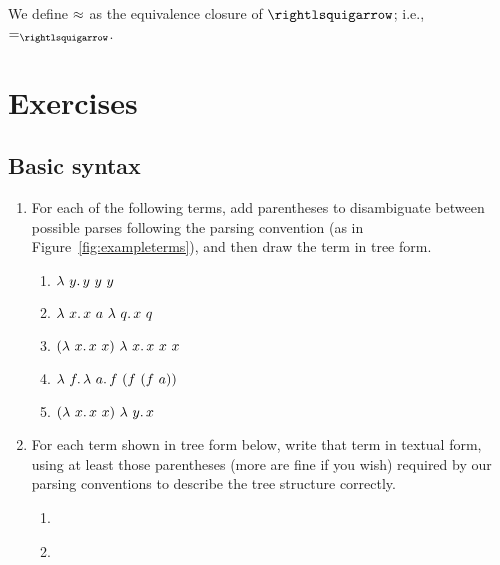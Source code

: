 \begin{definition}
\label{def:betaeq}
  We define $\approx$ as the equivalence closure of $\betaa$; i.e., $=_{\betaa}$.
  \end{definition}

\section{Exercises}

\subsection{Basic syntax}

\begin{enumerate}

  \item For each of the following terms, add parentheses to disambiguate
between possible parses following the parsing convention (as in
Figure~\ref{fig:exampleterms}), and then draw the term in tree form.

\begin{enumerate}
\item $\lambda\ y.\, y\ y\ y$
\item $\lam{x}{x\ a\ \lam{q}{x\ q}}$
\item $(\lam{x}{x\ x})\ \lam{x}{x\ x\ x}$
\item $\lam{f}{\lam{a}{f\ (f\ (f\ a))}}$
\item $(\lam{x}{x\ x})\ \lam{y}{x}$
\end{enumerate}

\item For each term shown in tree form below, write that term in
  textual form, using at least those parentheses (more are fine if you
  wish) required by our parsing conventions to describe the tree
  structure correctly.


  \begin{enumerate}
  \item

    \


  \item


\end{enumerate}
\end{enumerate}
